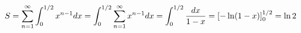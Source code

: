 \documentclass[preview]{standalone}
\begin{document}
\begin{align*}
\special{dvisvgm:raw <g id='unique000'>}S=\displaystyle\sum_{n=1}^{\infty}\int_0^{1/2}x^{n-1}dx=\int_0^{1/2}\sum_{n=1}^{\infty}x^{n-1}dx=\int_0^{1/2}\dfrac{dx}{1-x}=\left[-\ln(1-x)\right]_0^{1/2}=\ln 2\special{dvisvgm:raw </g>}
\end{align*}
\end{document}
